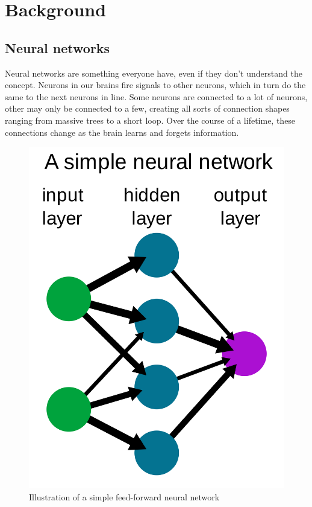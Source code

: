 \chapter{Background}


\section{Neural networks}


Neural networks are something everyone have, even if they don't understand the concept. 
Neurons in our brains fire signals to other neurons, which in turn do the same to the next neurons in line. 
Some neurons are connected to a lot of neurons, other may only be connected to a few, creating all sorts of connection shapes ranging from massive trees to a short loop. 
Over the course of a lifetime, these connections change as the brain learns and forgets information.

\begin{figure}[htbp]  %
  \centering
  \includegraphics[width=.5\textwidth]{figures/2000px-Neural_network_example.svg.png}
  \caption{Illustration of a simple feed-forward neural network\cite{wiki:simplennimage}}
  \label{fig:simplenn}
\end{figure}


